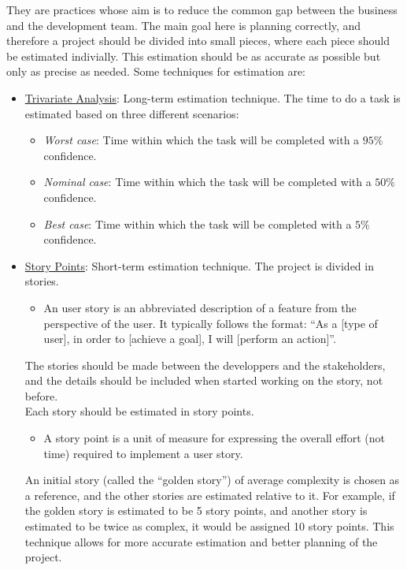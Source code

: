 They are practices whose aim is to reduce the common gap between the business and the development team. The main goal here is planning correctly, and therefore a project should be divided into small pieces, where each piece should be estimated indivially. This estimation should be as accurate as possible but only as precise as needed. Some techniques for estimation are:
\begin{itemize}
    \item \ul{Trivariate Analysis}: Long-term estimation technique.
    The time to do a task is estimated based on three different scenarios:
    \begin{itemize}
        \item \emph{Worst case}: Time within which the task will be completed with a $95\%$ confidence.
        \item \emph{Nominal case}: Time within which the task will be completed with a $50\%$ confidence.
        \item \emph{Best case}: Time within which the task will be completed with a $5\%$ confidence.
    \end{itemize}


    \item \ul{Story Points}: Short-term estimation technique.
    The project is divided in stories.
    \begin{itemize}
        \item An user story is an abbreviated description of a feature from the perspective of the user. It typically follows the format: ``As a [type of user], in order to [achieve a goal], I will [perform an action]''.
    \end{itemize}

    The stories should be made between the developpers and the stakeholders, and the details should be included when started working on the story, not before.\\

    Each story should be estimated in story points.
    \begin{itemize}
        \item A story point is a unit of measure for expressing the overall effort (not time) required to implement a user story.
    \end{itemize}
    
    An initial story (called the ``golden story'') of average complexity is chosen as a reference, and the other stories are estimated relative to it. For example, if the golden story is estimated to be 5 story points, and another story is estimated to be twice as complex, it would be assigned 10 story points. This technique allows for more accurate estimation and better planning of the project.\\


\end{itemize}
